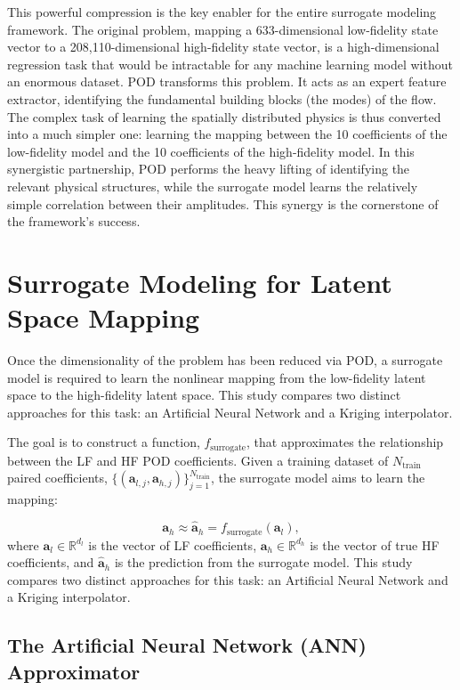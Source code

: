 \documentclass[tg, EN]{ufabcFHZh_tg}
\begin{document}
This powerful compression is the key enabler for the entire surrogate modeling framework. The original problem, mapping a 633-dimensional low-fidelity state vector to a 208,110-dimensional high-fidelity state vector, is a high-dimensional regression task that would be intractable for any machine learning model without an enormous dataset. POD transforms this problem. It acts as an expert feature extractor, identifying the fundamental building blocks (the modes) of the flow. The complex task of learning the spatially distributed physics is thus converted into a much simpler one: learning the mapping between the 10 coefficients of the low-fidelity model and the 10 coefficients of the high-fidelity model. In this synergistic partnership, POD performs the heavy lifting of identifying the relevant physical structures, while the surrogate model learns the relatively simple correlation between their amplitudes. This synergy is the cornerstone of the framework's success.

\section{Surrogate Modeling for Latent Space Mapping}

Once the dimensionality of the problem has been reduced via POD, a surrogate model is required to learn the nonlinear mapping from the low-fidelity latent space to the high-fidelity latent space. This study compares two distinct approaches for this task: an Artificial Neural Network and a Kriging interpolator.

The goal is to construct a function, $f_{\text{surrogate}}$, that approximates the relationship between the LF and HF POD coefficients. Given a training dataset of $N_{\text{train}}$ paired coefficients, $\{ (\mathbf{a}_{l,j}, \mathbf{a}_{h,j}) \}_{j=1}^{N_{\text{train}}}$, the surrogate model aims to learn the mapping:

\begin{equation}
    \mathbf{a}_h \approx \hat{\mathbf{a}}_h = f_{\text{surrogate}}(\mathbf{a}_l),
    \label{eq:surrogate_mapping}
\end{equation}
where $\mathbf{a}_l \in \mathbb{R}^{d_l}$ is the vector of LF coefficients, $\mathbf{a}_h \in \mathbb{R}^{d_h}$ is the vector of true HF coefficients, and $\hat{\mathbf{a}}_h$ is the prediction from the surrogate model. This study compares two distinct approaches for this task: an Artificial Neural Network and a Kriging interpolator.


\subsection{The Artificial Neural Network (ANN) Approximator}
\end{document}
